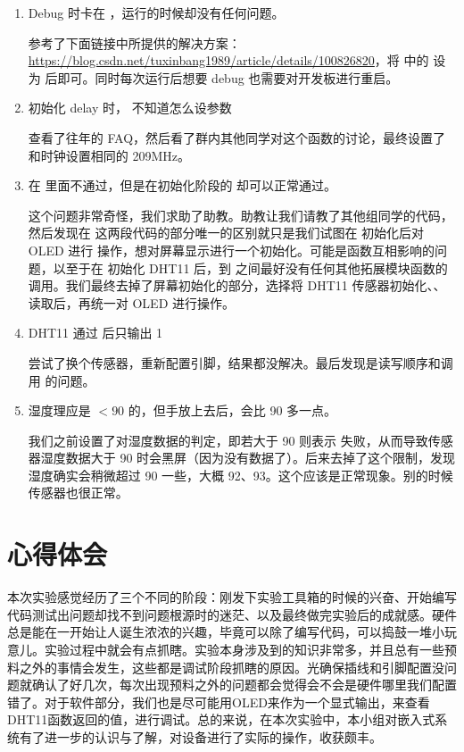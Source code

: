 \begin{enumerate}
    \item Debug 时卡在 ，运行的时候却没有任何问题。
    
    参考了下面链接中所提供的解决方案：\url{https://blog.csdn.net/tuxinbang1989/article/details/100826820}，将  中的  设为  后即可。同时每次运行后想要 debug 也需要对开发板进行重启。

    \item 初始化 delay 时， 不知道怎么设参数
    
    查看了往年的 FAQ，然后看了群内其他同学对这个函数的讨论，最终设置了和时钟设置相同的 209\si{\mega\hertz}。

    \item {} 在  里面不通过，但是在初始化阶段的  却可以正常通过。
    
    这个问题非常奇怪，我们求助了助教。助教让我们请教了其他组同学的代码，然后发现在  这两段代码的部分唯一的区别就只是我们试图在  初始化后对 OLED 进行  操作，想对屏幕显示进行一个初始化。可能是函数互相影响的问题，以至于在  初始化 DHT11 后，到  之间最好没有任何其他拓展模块函数的调用。我们最终去掉了屏幕初始化的部分，选择将 DHT11 传感器初始化、、读取后，再统一对 OLED 进行操作。

    \item DHT11 通过  后只输出 1
    
    尝试了换个传感器，重新配置引脚，结果都没解决。最后发现是读写顺序和调用  的问题。

    \item 湿度理应是 $<90$ 的，但手放上去后，会比 90 多一点。

    我们之前设置了对湿度数据的判定，即若大于 90 则表示  失败，从而导致传感器湿度数据大于 90 时会黑屏（因为没有数据了）。后来去掉了这个限制，发现湿度确实会稍微超过 90 一些，大概 92、93。这个应该是正常现象。别的时候传感器也很正常。

\end{enumerate}


\section{心得体会}

本次实验感觉经历了三个不同的阶段：刚发下实验工具箱的时候的兴奋、开始编写代码测试出问题却找不到问题根源时的迷茫、以及最终做完实验后的成就感。硬件总是能在一开始让人诞生浓浓的兴趣，毕竟可以除了编写代码，可以捣鼓一堆小玩意儿。实验过程中就会有点抓瞎。实验本身涉及到的知识非常多，并且总有一些预料之外的事情会发生，这些都是调试阶段抓瞎的原因。光确保插线和引脚配置没问题就确认了好几次，每次出现预料之外的问题都会觉得会不会是硬件哪里我们配置错了。对于软件部分，我们也是尽可能用OLED来作为一个显式输出，来查看DHT11函数返回的值，进行调试。总的来说，在本次实验中，本小组对嵌入式系统有了进一步的认识与了解，对设备进行了实际的操作，收获颇丰。